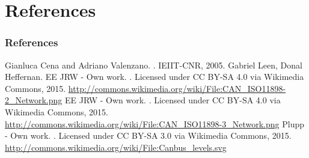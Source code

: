 \documentclass{beamer}
\begin{document}
\section*{References}
\begin{frame}[allowframebreaks]
  \frametitle{References}    
  \begin{thebibliography}{10}    
  \beamertemplatebookbibitems
    Gianluca Cena and Adriano Valenzano.
    .
    \newblock IEIIT-CNR, 2005.
  Gabriel Leen, Donal Heffernan.
  \beamertemplatearticlebibitems
    EE JRW - Own work.
    .
    \newblock Licensed under CC BY-SA 4.0 via Wikimedia Commons, 2015.
    \newblock \url{http://commons.wikimedia.org/wiki/File:CAN_ISO11898-2_Network.png}
    EE JRW - Own work.
    .
    \newblock Licensed under CC BY-SA 4.0 via Wikimedia Commons, 2015.
    \newblock \url{http://commons.wikimedia.org/wiki/File:CAN_ISO11898-3_Network.png}
    Plupp - Own work.
    .
    \newblock Licensed under CC BY-SA 3.0 via Wikimedia Commons, 2015.
    \newblock \url{http://commons.wikimedia.org/wiki/File:Canbus_levels.svg}    		
	\end{thebibliography}
\end{frame}

\end{document}
